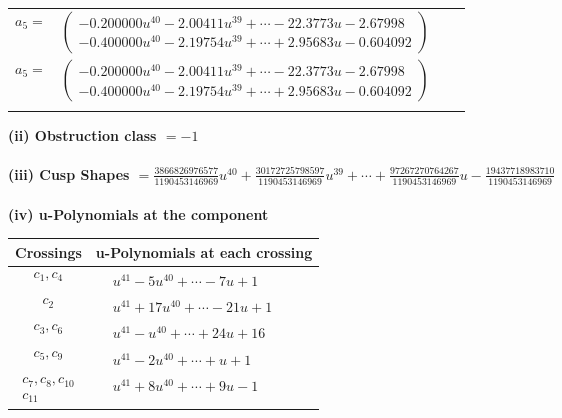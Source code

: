 \documentclass[1p]{elsarticle_modified}
\theoremstyle{definition}
\begin{document}
\begin{tabular}{m{7pt} m{180pt} m{7pt} m{180pt} }
\flushright $a_{5}=$&$\begin{pmatrix}-0.200000 u^{40}-2.00411 u^{39}+\cdots-22.3773 u-2.67998\\-0.400000 u^{40}-2.19754 u^{39}+\cdots+2.95683 u-0.604092\end{pmatrix}$\\ \flushright $a_{5}=$&$\begin{pmatrix}-0.200000 u^{40}-2.00411 u^{39}+\cdots-22.3773 u-2.67998\\-0.400000 u^{40}-2.19754 u^{39}+\cdots+2.95683 u-0.604092\end{pmatrix}$\\&\end{tabular}
\flushleft \textbf{(ii) Obstruction class $= -1$}\\~\\
\flushleft \textbf{(iii) Cusp Shapes $= \frac{3866826976577}{1190453146969} u^{40}+\frac{30172725798597}{1190453146969} u^{39}+\cdots+\frac{97267270764267}{1190453146969} u-\frac{19437718983710}{1190453146969}$}\\~\\
\newpage\renewcommand{\arraystretch}{1}
\flushleft \textbf{(iv) u-Polynomials at the component}\newline \\
\begin{tabular}{m{50pt}|m{274pt}}
Crossings & \hspace{64pt}u-Polynomials at each crossing \\
\hline $$\begin{aligned}c_{1},c_{4}\end{aligned}$$&$\begin{aligned}
&u^{41}-5 u^{40}+\cdots-7 u+1
\end{aligned}$\\
\hline $$\begin{aligned}c_{2}\end{aligned}$$&$\begin{aligned}
&u^{41}+17 u^{40}+\cdots-21 u+1
\end{aligned}$\\
\hline $$\begin{aligned}c_{3},c_{6}\end{aligned}$$&$\begin{aligned}
&u^{41}- u^{40}+\cdots+24 u+16
\end{aligned}$\\
\hline $$\begin{aligned}c_{5},c_{9}\end{aligned}$$&$\begin{aligned}
&u^{41}-2 u^{40}+\cdots+u+1
\end{aligned}$\\
\hline $$\begin{aligned}c_{7},c_{8},c_{10}\\c_{11}\end{aligned}$$&$\begin{aligned}
&u^{41}+8 u^{40}+\cdots+9 u-1
\end{aligned}$\\
\hline
\end{tabular}\\~\\
\end{document}
